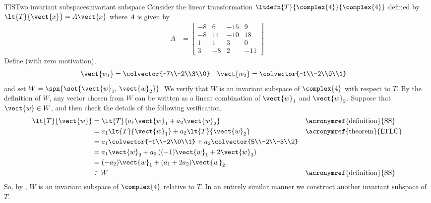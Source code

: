 \begin{example}{TIS}{Two invariant subspaces}{invariant subspace}
Consider the linear transformation $\ltdefn{T}{\complex{4}}{\complex{4}}$ defined by $\lt{T}{\vect{x}}=A\vect{x}$ where $A$ is given by
%
\begin{align*}
A&=
\begin{bmatrix}
 -8 & 6 & -15 & 9 \\
 -8 & 14 & -10 & 18 \\
 1 & 1 & 3 & 0 \\
 3 & -8 & 2 & -11
\end{bmatrix}
\end{align*}
%
Define (with zero motivation),
%
\begin{align*}
\vect{w_1}&=\colvector{-7\\-2\\3\\0}
&
\vect{w_2}&=\colvector{-1\\-2\\0\\1}
\end{align*}
%
and set $W=\spn{\set{\vect{w}_1,\,\vect{w}_2}}$.  We verify that $W$ is an invariant subspace of $\complex{4}$ with respect to $T$.  By the definition of $W$, any vector chosen from $W$ can be written as a linear combination of $\vect{w}_1$ and $\vect{w}_2$.  Suppose that $\vect{w}\in W$, and then check the details of the following verification,
%
\begin{align*}
\lt{T}{\vect{w}}
&=\lt{T}{a_1\vect{w}_1+a_2\vect{w}_2}&&\text{\acronymref{definition}{SS}}\\
&=a_1\lt{T}{\vect{w}_1}+a_2\lt{T}{\vect{w}_2}&&\text{\acronymref{theorem}{LTLC}}\\
&=a_1\colvector{-1\\-2\\0\\1}+a_2\colvector{5\\-2\\-3\\2}\\
&=a_1\vect{w}_2+a_2\left((-1)\vect{w}_1+2\vect{w}_2\right)\\
&=(-a_2)\vect{w}_1+(a_1+2a_2)\vect{w}_2\\
&\in W&&\text{\acronymref{definition}{SS}}
\end{align*}
%
So, by , $W$ is an invariant subspace of $\complex{4}$ relative to $T$.  In an entirely similar manner we construct another invariant subspace of $T$.\par

\end{example}
